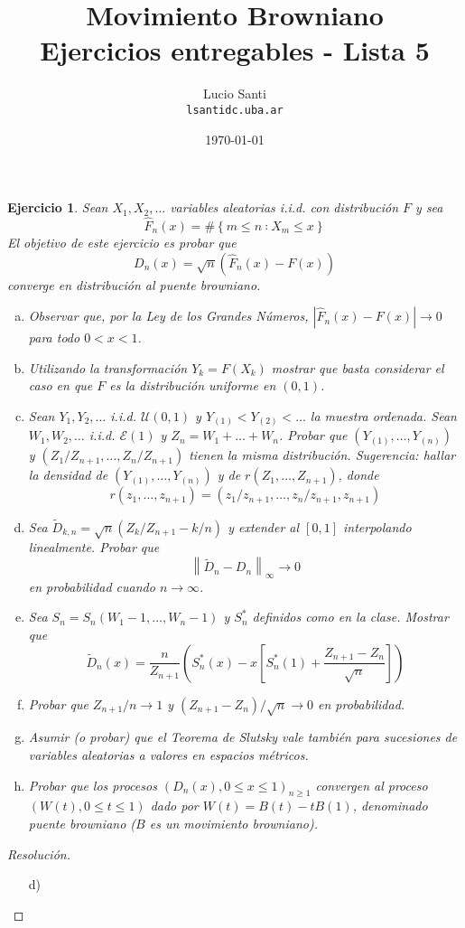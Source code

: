 \documentclass[a4paper,11pt]{article}
\title{Movimiento Browniano\\
      \small{Ejercicios entregables - Lista 5}}
\author{Lucio Santi\\
        \texttt{lsanti\at dc.uba.ar}}
\date{\today}
\newcommand{\abs}[1]{\ensuremath{\left\lvert #1 \right\rvert}}
\newcommand{\norm}[1]{\left\lVert#1\right\rVert}
\newcommand{\normi}[1]{\norm{#1}_{\infty}}
\newcommand{\Sst}[1]{S_n^{*}(#1)}
\newtheorem*{ej}{Ejercicio}
\begin{document}
\maketitle

\begin{ej} 
Sean $X_1, X_2, \dots$ variables aleatorias i.i.d. con distribución $F$ y sea
$$\hat{F}_n(x) = \#\left\{m \leq n ∶  X_m \leq x \right\}$$
El objetivo de este ejercicio es probar que
$$D_n(x) = \sqrt{n} (\hat{F}_n(x) − F(x))$$
converge en distribución al \textsl{puente browniano}.

\begin{enumerate}[a.]
    \item Observar que, por la Ley de los Grandes Números,
    $\abs{\hat{F}_n(x) − F (x)} \to 0$ para todo $0 < x < 1$.

    \item Utilizando la transformación $Y_k = F(X_k)$ mostrar que basta
    considerar el caso en que $F$ es la distribución uniforme en $(0, 1)$.

    \item Sean $Y_1, Y_2, \dots$ i.i.d. $\mathcal{U}(0, 1)$ y
    $Y_{(1)} < Y_{(2)} < \dots$ la muestra ordenada. Sean
    $W_1, W_2, \dots$ i.i.d. $\mathcal{E}(1)$ y
    $Z_n = W_1 + \dots + W_n$. Probar que
    $(Y_{(1)}, \dots, Y_{(n)})$ y $(Z_1/Z_{n+1}, \dots, Z_n/Z_{n+1})$
    tienen la misma distribución. Sugerencia: hallar la densidad de
    $(Y_{(1)}, \dots, Y_{(n)})$ y de $r(Z_1, \dots, Z_{n+1})$, donde
    $$r(z_1, \dots, z_{n+1}) = (z_1/z_{n+1}, \dots, z_n/z_{n+1}, z_{n+1})$$

    \item Sea $\tilde{D}_{k,n} = \sqrt{n} (Z_k/Z_{n+1} − k/n)$ y extender al
    $[0, 1]$ interpolando linealmente. Probar que
    $$\normi{\tilde{D}_n - D_n} \to 0$$
    en probabilidad cuando $n \to \infty$.

    \item Sea $S_n = S_n(W_1 − 1, \dots, W_n − 1)$ y $S_n^{*}$ definidos como
    en la clase. Mostrar que
    $$\tilde{D}_n(x) = \frac{n}{Z_{n+1}} \left(\Sst{x} - x \left[ \Sst{1} + \frac{Z_{n+1} - Z_n}{\sqrt{n}} \right] \right)$$

    \item Probar que $Z_{n+1}/n \to 1$ y 
    $(Z_{n+1} - Z_n)/\sqrt{n} \to 0$
    en probabilidad.

    \item Asumir (o probar) que el Teorema de Slutsky vale también para
    sucesiones de variables aleatorias a valores en espacios métricos.

    \item Probar que los procesos $(D_n(x), 0 \leq x \leq 1)_{n \geq 1}$
    convergen al proceso $(W(t), 0 \leq t \leq 1)$ dado por
    $W(t) = B(t) − tB(1)$,
    denominado \textsl{puente browniano} ($B$ es un movimiento browniano).
\end{enumerate}
\end{ej}

\begin{proof}[Resoluci\'on]
$ $ 
\begin{enumerate}
    \item[d)]
\end{enumerate}
\end{proof}
\end{document}

